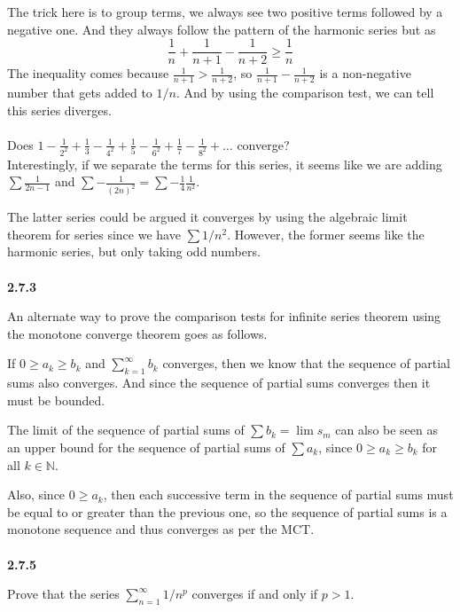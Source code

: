 The trick here is to group terms, we always see two positive terms followed by a negative one.
And they always follow the pattern of the harmonic series but as
$$
\frac{1}{n} + \frac{1}{n+1} - \frac{1}{n+2} \geq \frac{1}{n}
$$
The inequality comes because $\frac{1}{n+1} > \frac{1}{n+2}$, so $\frac{1}{n+1} - \frac{1}{n+2}$
is a non-negative number that gets added to $1/n$.
And by using the comparison test, we can tell this series diverges.
\\~\\

Does $1 - \frac{1}{2^2} +\frac{1}{3} -\frac{1}{4^2} + \frac{1}{5} -\frac{1}{6^2} +\frac{1}{7} -\frac{1}{8^2} + \ldots$
converge?
\\

Interestingly, if we separate the terms for this series, it seems like we are adding
$\sum \frac{1}{2n -1}$ and $\sum -\frac{1}{(2n)^2} = \sum -\frac{1}{4}\frac{1}{n^2}$.

The latter series could be argued it converges by using the algebraic limit theorem for series
since we have $\sum 1/n^2$.
However, the former seems like the harmonic series, but only taking odd numbers.
\\~\\



\textbf{2.7.3}

An alternate way to prove the comparison tests for infinite series theorem using the monotone converge theorem
goes as follows.

If $0 \geq a_k \geq b_k$ and $\sum^{\infty}_{k=1} b_k$ converges, then we know that
the sequence of partial sums also converges.
And since the sequence of partial sums converges then it must be bounded.

The limit of the sequence of partial sums of $\sum b_k = \lim s_m$ can also be seen as an upper bound
for the sequence of partial sums of $\sum a_k$, since $0 \geq a_k \geq b_k$ for all $k\in\mathbb{N}$.

Also, since $0 \geq a_k$, then each successive term in the sequence of partial sums must be
equal to or greater than the previous one, so the sequence of partial sums is a monotone sequence
and thus converges as per the MCT.
\\~\\



\textbf{2.7.5}

Prove that the series $\sum^{\infty}_{n=1} 1/n^p$ converges if and only if $p > 1$.
\\

